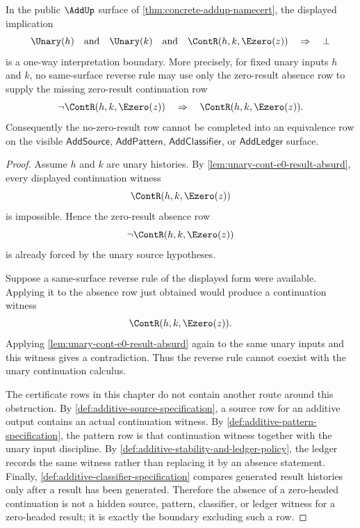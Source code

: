\begin{proposition}
\label{prop:unary-zero-result-one-way-boundary}
In the public $\AddUp$ surface of \autoref{thm:concrete-addup-namecert}, the displayed implication
$$
  \Unary(h)
  \quad\text{and}\quad
  \Unary(k)
  \quad\text{and}\quad
  \ContR(h,k,\Ezero(z))
  \quad\Rightarrow\quad
  \bot
$$
is a one-way interpretation boundary. More precisely, for fixed unary inputs $h$ and $k$, no same-surface reverse rule may use only the zero-result absence row to supply the missing zero-result continuation row
$$
  \neg\ContR(h,k,\Ezero(z))
  \quad\Rightarrow\quad
  \ContR(h,k,\Ezero(z)).
$$
Consequently the no-zero-result row cannot be completed into an equivalence row on the visible $\mathsf{AddSource}$, $\mathsf{AddPattern}$, $\mathsf{AddClassifier}$, or $\mathsf{AddLedger}$ surface.
\end{proposition}
\begin{proof}
Assume $h$ and $k$ are unary histories. By \autoref{lem:unary-cont-e0-result-absurd}, every displayed continuation witness
$$
  \ContR(h,k,\Ezero(z))
$$
is impossible. Hence the zero-result absence row
$$
  \neg\ContR(h,k,\Ezero(z))
$$
is already forced by the unary source hypotheses.

Suppose a same-surface reverse rule of the displayed form were available. Applying it to the absence row just obtained would produce a continuation witness
$$
  \ContR(h,k,\Ezero(z)).
$$
Applying \autoref{lem:unary-cont-e0-result-absurd} again to the same unary inputs and this witness gives a contradiction. Thus the reverse rule cannot coexist with the unary continuation calculus.

The certificate rows in this chapter do not contain another route around this obstruction. By \autoref{def:additive-source-specification}, a source row for an additive output contains an actual continuation witness. By \autoref{def:additive-pattern-specification}, the pattern row is that continuation witness together with the unary input discipline. By \autoref{def:additive-stability-and-ledger-policy}, the ledger records the same witness rather than replacing it by an absence statement. Finally, \autoref{def:additive-classifier-specification} compares generated result histories only after a result has been generated. Therefore the absence of a zero-headed continuation is not a hidden source, pattern, classifier, or ledger witness for a zero-headed result; it is exactly the boundary excluding such a row.
\end{proof}
